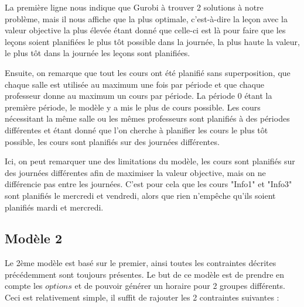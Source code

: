 La première ligne nous indique que Gurobi à trouver 2 solutions à notre problème, mais il nous affiche que la plus optimale, c'est-à-dire la leçon avec la valeur objective la plus élevée étant donné que celle-ci est là pour faire que les leçons soient planifiées le plus tôt possible dans la journée, la plus haute la valeur, le plus tôt dans la journée les leçons sont planifiées.

Ensuite, on remarque que tout les cours ont été planifié sans superposition, que chaque salle est utilisée au maximum une fois par période et que chaque professeur donne au maximum un cours par période. La période 0 étant la première période, le modèle y a mis le plus de cours possible. Les cours nécessitant la même salle ou les mêmes professeurs sont planifiés à des périodes différentes et étant donné que l'on cherche à planifier les cours le plus tôt possible, les cours sont planifiés sur des journées différentes.

Ici, on peut remarquer une des limitations du modèle, les cours sont planifiés sur des journées différentes afin de maximiser la valeur objective, mais on ne différencie pas entre les journées. C'est pour cela que les cours "Info1" et "Info3" sont planifiés le mercredi et vendredi, alors que rien n'empêche qu'ils soient planifiés mardi et mercredi.

\subsection{Modèle 2}
Le 2ème modèle est basé sur le premier, ainsi toutes les contraintes décrites précédemment sont toujours présentes. Le but de ce modèle est de prendre en compte les $options$ et de pouvoir générer un horaire pour 2 groupes différents. Ceci est relativement simple, il suffit de rajouter les 2 contraintes suivantes :

